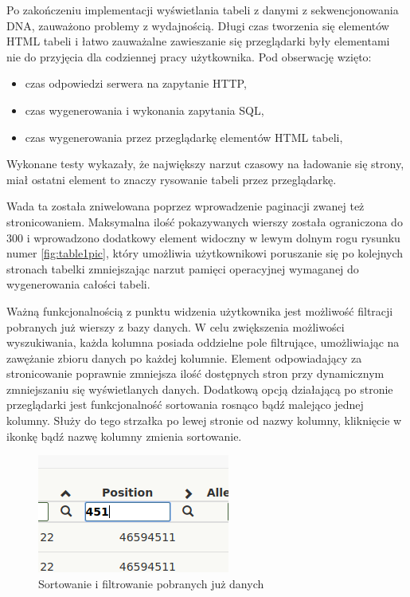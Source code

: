 \documentclass[a4paper,12pt,twoside]{article}
\begin{document}
Po zakończeniu implementacji wyświetlania tabeli z danymi z sekwencjonowania DNA,
zauważono problemy z wydajnością.
Długi czas tworzenia się elementów HTML tabeli i łatwo zauważalne zawieszanie się przeglądarki
były elementami nie do przyjęcia dla codziennej pracy użytkownika.
Pod obserwację wzięto:
\begin{itemize}
\item czas odpowiedzi serwera na zapytanie HTTP,
\item czas wygenerowania i wykonania zapytania SQL,
\item czas wygenerowania przez przeglądarkę elementów HTML tabeli,
\end{itemize} 
Wykonane testy wykazały, że największy narzut czasowy na ładowanie się strony, miał ostatni 
element to znaczy rysowanie tabeli przez przeglądarkę. 

Wada ta została zniwelowana poprzez wprowadzenie paginacji zwanej też stronicowaniem.
Maksymalna ilość pokazywanych wierszy została ograniczona do 300 i wprowadzono dodatkowy 
element widoczny w lewym dolnym rogu rysunku numer \ref{fig:table1pic}, który umożliwia 
użytkownikowi poruszanie się po kolejnych stronach tabelki zmniejszając narzut 
pamięci operacyjnej wymaganej do wygenerowania całości tabeli.  
\newline

Ważną funkcjonalnością z punktu widzenia użytkownika jest możliwość filtracji pobranych już wierszy
z bazy danych. W celu zwiększenia możliwości wyszukiwania, każda kolumna posiada oddzielne pole 
filtrujące, umożliwiając na zawężanie zbioru danych po każdej kolumnie. Element odpowiadający
za stronicowanie poprawnie zmniejsza ilość dostępnych stron przy dynamicznym zmniejszaniu się
wyświetlanych danych.
Dodatkową opcją działającą po stronie przeglądarki jest 
funkcjonalność sortowania rosnąco bądź malejąco jednej kolumny. Służy do tego strzałka po
lewej stronie od nazwy kolumny, kliknięcie w ikonkę bądź nazwę kolumny zmienia sortowanie.

\begin{figure}[h]
\centering
  \includegraphics{obrazy/aplikacja/sortingAndSearch.png}
  \caption{Sortowanie i filtrowanie pobranych już danych}
  \label{fig:sortingAndSearchpic}
\end{figure}
\end{document}
